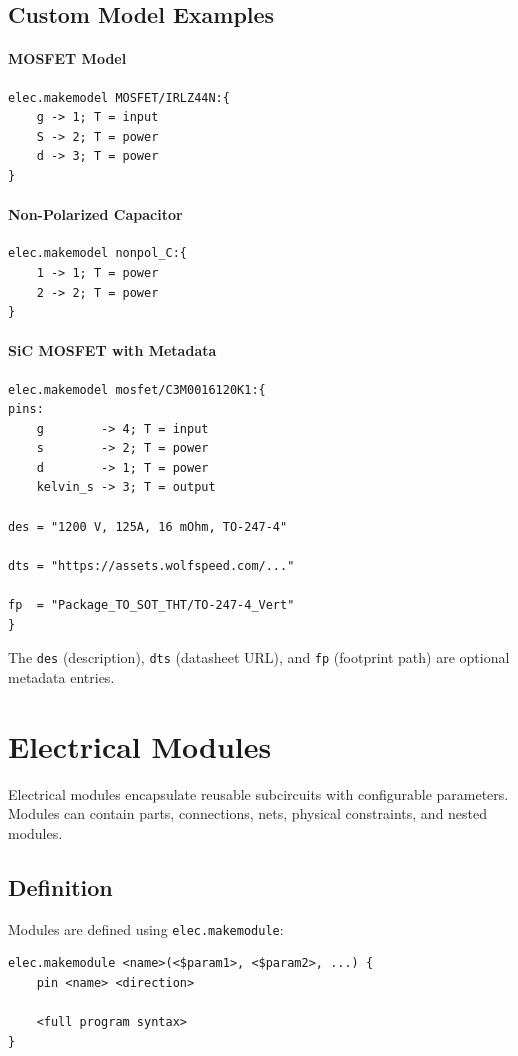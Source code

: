 \subsection{Custom Model Examples}

\paragraph{MOSFET Model}
\begin{verbatim}
elec.makemodel MOSFET/IRLZ44N:{
    g -> 1; T = input
    S -> 2; T = power
    d -> 3; T = power
}
\end{verbatim}

\paragraph{Non-Polarized Capacitor}
\begin{verbatim}
elec.makemodel nonpol_C:{
    1 -> 1; T = power
    2 -> 2; T = power
}
\end{verbatim}

\paragraph{SiC MOSFET with Metadata}
\begin{verbatim}
elec.makemodel mosfet/C3M0016120K1:{
pins:
    g        -> 4; T = input
    s        -> 2; T = power
    d        -> 1; T = power
    kelvin_s -> 3; T = output

des = "1200 V, 125A, 16 mOhm, TO-247-4"

dts = "https://assets.wolfspeed.com/..."

fp  = "Package_TO_SOT_THT/TO-247-4_Vert"
}
\end{verbatim}

The \texttt{des} (description), \texttt{dts} (datasheet URL), and \texttt{fp} (footprint path) are optional metadata entries.

\section{Electrical Modules}
\label{sec:modules}
Electrical modules encapsulate reusable subcircuits with configurable parameters. Modules can contain parts, connections, nets, physical constraints, and nested modules.

\subsection{Definition}
Modules are defined using \texttt{elec.makemodule}:
\begin{verbatim}
elec.makemodule <name>(<$param1>, <$param2>, ...) {
    pin <name> <direction>
    
    <full program syntax>
}
\end{verbatim}

